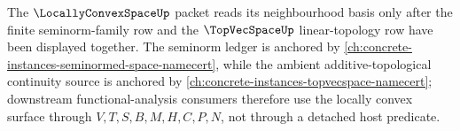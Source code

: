 The $\LocallyConvexSpaceUp$ packet reads its neighbourhood basis only after the finite seminorm-family row and the $\TopVecSpaceUp$ linear-topology row have been displayed together. The seminorm ledger is anchored by \autoref{ch:concrete-instances-seminormed-space-namecert}, while the ambient additive-topological continuity source is anchored by \autoref{ch:concrete-instances-topvecspace-namecert}; downstream functional-analysis consumers therefore use the locally convex surface through $V,T,S,B,M,H,C,P,N$, not through a detached host predicate.
